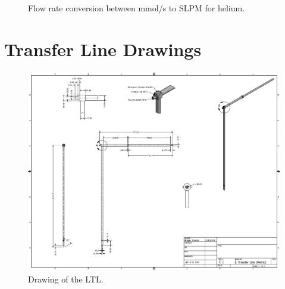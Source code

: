 \begin{appendices}
\begin{figure}
\begin{tabular}{|c|c|c|}
\end{tabular}
\caption{Flow rate conversion between mmol/s to SLPM for helium.}
\label{fig:slpm-conversion}
\end{figure} 

\chapter{Transfer Line Drawings}
\label{appendix:tl-drawings}

\begin{figure}[!h]
 \centering
 \includegraphics[width=\textwidth]{./img/LTL-drawing.png}
 \caption{Drawing of the LTL.}
 \label{fig:LTL-drawing}
\end{figure}


\end{appendices}
